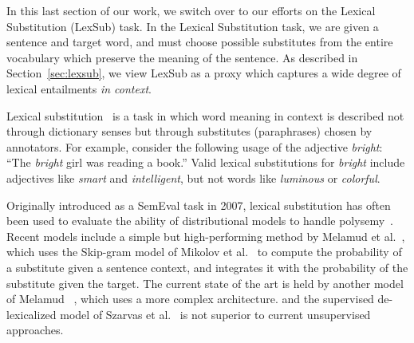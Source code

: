 \hardline

In this last section of our work, we switch over to our efforts on the Lexical
Substitution (LexSub) task. In the Lexical Substitution task, we are given
a sentence and target word, and must choose possible substitutes from the
entire vocabulary which preserve the meaning of the sentence.
As described in Section~\ref{sec:lexsub}, we view
LexSub as a proxy which captures a wide degree of lexical entailments {\em in
context}.

\hardline


Lexical substitution~\cite{mccarthy:2007:semeval} is a task in which word
meaning in context is described not through dictionary senses but through
substitutes (paraphrases) chosen by annotators.
For example, consider the following usage of the adjective {\em bright}:
``The {\em bright} girl was reading a book.'' Valid lexical substitutions for
{\em bright} include adjectives like {\em smart} and {\em intelligent}, but
not words like {\em luminous} or {\em colorful}.

Originally introduced as a SemEval task in 2007, lexical substitution has often
been used to evaluate the ability of distributional models to handle
polysemy~\cite{erk:2008:emnlp,thater:2010:acl,dinu:2010:emnlp,vandecruys:2011:emnlp,melamud:2015:vsm,melamud:2015:naacl,kawakami:2016:iclr}.
Recent models include a simple but high-performing method by Melamud et
al.~, which uses the Skip-gram model of Mikolov et
al.~\cite{mikolov:2013:iclr} to compute the probability of a substitute given a
sentence context, and integrates it with the probability of the substitute
given the target. The current state of the art is held by another model of
Melamud ~\cite{melamud:2015:naacl}, which uses a more complex architecture.
and the supervised de-lexicalized model of Szarvas et
al.~ is not superior to current unsupervised
approaches. 

